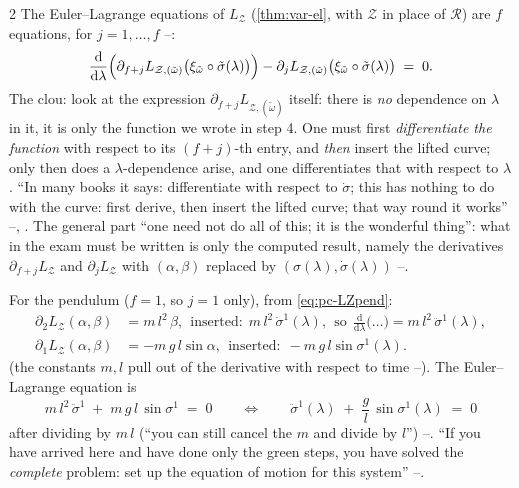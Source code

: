 \begin{paracol}{2}
The Euler--Lagrange equations of $L_{\mathcal Z}$ (\cref{thm:var-el}, with $\mathcal Z$ in place of $\mathcal R$) are $f$ equations, for $j=1,\dots,f$ --:
\begin{equation}\label{eq:pc-EL}
  \frac{\mathrm d}{\mathrm d\lambda}\Bigl(\partial_{f+j}L_{\mathcal Z,(\tilde\omega)}\bigl(\xi_{\tilde\omega}\circ\tilde\sigma(\lambda)\bigr)\Bigr)-\partial_jL_{\mathcal Z,(\tilde\omega)}\bigl(\xi_{\tilde\omega}\circ\tilde\sigma(\lambda)\bigr)\;=\;0 .
\end{equation}
The clou: look at the expression $\partial_{f+j}L_{\mathcal Z,(\tilde\omega)}$ itself: there is \emph{no} dependence on $\lambda$ in it, it is only the function we wrote in step 4. One must first \emph{differentiate the function} with respect to its $(f+j)$-th entry, and \emph{then} insert the lifted curve; only then does a $\lambda$-dependence arise, and one differentiates that with respect to $\lambda$. ``In many books it says: differentiate with respect to $\dot\sigma$; this has nothing to do with the curve: first derive, then insert the lifted curve; that way round it works'' --, . The general part ``one need not do all of this; it is the wonderful thing'': what in the exam must be written is only the computed result, namely the derivatives $\partial_{f+j}L_{\mathcal Z}$ and $\partial_jL_{\mathcal Z}$ with $(\alpha,\beta)$ replaced by $(\sigma(\lambda),\dot\sigma(\lambda))$ --.

For the pendulum ($f=1$, so $j=1$ only), from \eqref{eq:pc-LZpend}:
\begin{align*}
  \partial_{2}L_{\mathcal Z}(\alpha,\beta)&=m\,l^2\,\beta,\ \ \text{inserted:}\ \ m\,l^2\,\dot\sigma^1(\lambda),\ \ \text{so}\ \ \frac{\mathrm d}{\mathrm d\lambda}\bigl(\dots\bigr)=m\,l^2\,\ddot\sigma^1(\lambda),\\
  \partial_{1}L_{\mathcal Z}(\alpha,\beta)&=-m\,g\,l\sin\alpha,\ \ \text{inserted:}\ \ -m\,g\,l\sin\sigma^1(\lambda).
\end{align*}
(the constants $m,l$ pull out of the derivative with respect to time --). The Euler--Lagrange equation is
\begin{equation}\label{eq:pc-pendEL}
  m\,l^2\,\ddot\sigma^1\;+\;m\,g\,l\,\sin\sigma^1\;=\;0\qquad\Longleftrightarrow\qquad\ddot\sigma^1(\lambda)\;+\;\frac{g}{l}\,\sin\sigma^1(\lambda)\;=\;0
\end{equation}
after dividing by $m\,l$ (``you can still cancel the $m$ and divide by $l$'') --. ``If you have arrived here and have done only the green steps, you have solved the \emph{complete} problem: set up the equation of motion for this system'' --.


\end{paracol}
